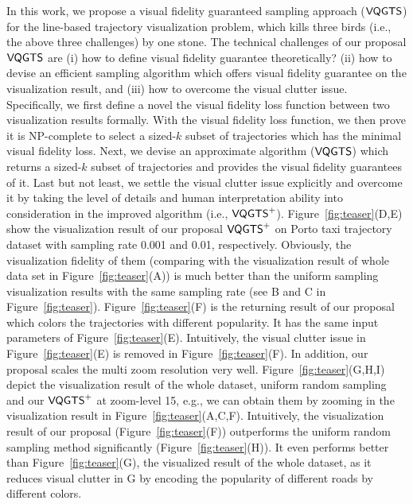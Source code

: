 In this work, we propose a visual fidelity guaranteed sampling approach ($\mathsf{VQGTS}{}$) for the line-based trajectory visualization problem,
which kills three birds (i.e., the above three challenges) by one stone.
The technical challenges of our proposal $\mathsf{VQGTS}{}$ are
(i) how to define visual fidelity guarantee theoretically?
(ii) how to devise an efficient sampling algorithm which offers visual fidelity guarantee on the visualization result,
and (iii) how to overcome the visual clutter issue.
Specifically, we first define a novel the visual fidelity loss function between two visualization results formally.
With the visual fidelity loss function, we then prove it is NP-complete to select a sized-$k$ subset of trajectories which has the minimal visual fidelity loss.
Next, we devise an approximate algorithm ($\mathsf{VQGTS}$) which returns a sized-$k$ subset of trajectories and provides the visual fidelity guarantees of it.
Last but not least, we settle the visual clutter issue explicitly and overcome it by taking the level of details and human interpretation ability into consideration in the improved algorithm (i.e., $\mathsf{VQGTS}^{+}$).
Figure~\ref{fig:teaser}(D,E) show the visualization result of our proposal $\mathsf{VQGTS}^{+}{}$ on Porto taxi trajectory dataset with sampling rate 0.001 and 0.01, respectively.
Obviously, the visualization fidelity of them (comparing with the visualization result of whole data set in Figure~\ref{fig:teaser}(A)) is much better than
the uniform sampling visualization results with the same sampling rate  (see B and C in Figure~\ref{fig:teaser}).
Figure~\ref{fig:teaser}(F) is the returning result of our proposal which colors the trajectories with different popularity.
It has the same input parameters of Figure~\ref{fig:teaser}(E).
Intuitively, the visual clutter issue in Figure~\ref{fig:teaser}(E) is  removed in Figure~\ref{fig:teaser}(F).
In addition, our proposal scales the multi zoom resolution very well.
Figure~\ref{fig:teaser}(G,H,I) depict the visualization result of the whole dataset, uniform random sampling and our $\mathsf{VQGTS}^{+}$ at zoom-level 15,
e.g., we can obtain them by zooming in the visualization result in Figure~\ref{fig:teaser}(A,C,F).
Intuitively, the visualization result of our proposal (Figure~\ref{fig:teaser}(F)) outperforms the uniform random sampling method significantly (Figure~\ref{fig:teaser}(H)).
It even performs better than Figure~\ref{fig:teaser}(G), the visualized result of the whole dataset, as it reduces visual clutter in G by encoding the popularity of different roads by different colors.

